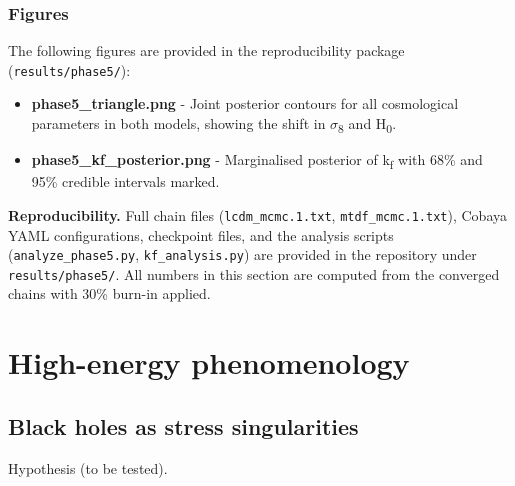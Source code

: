 \documentclass[11pt,a4paper]{article}
\begin{document}
\subsubsection{Figures}
The following figures are provided in the reproducibility package (\texttt{results/\allowbreak{}phase5/\allowbreak{}}):

\begin{itemize}
  \item \textbf{phase5\_\allowbreak{}triangle.png}  -  Joint posterior contours for all cosmological parameters in both models, showing the shift in $\sigma$\textsubscript{8} and H\textsubscript{0}.
  \item \textbf{phase5\_\allowbreak{}kf\_\allowbreak{}posterior.png}  -  Marginalised posterior of k\textsubscript{f} with 68\% and 95\% credible intervals marked.
\end{itemize}

\begin{mdframed}[linecolor=accent,linewidth=0.5pt,backgroundcolor=callout-bg,leftline=true,rightline=true,topline=true,bottomline=true,innerleftmargin=8pt,innerrightmargin=8pt,innertopmargin=6pt,innerbottommargin=6pt]
\textbf{Reproducibility.} Full chain files (\texttt{lcdm\_\allowbreak{}mcmc.1.txt}, \texttt{mtdf\_\allowbreak{}mcmc.1.txt}), Cobaya YAML configurations, checkpoint files, and the analysis scripts (\texttt{analyze\_\allowbreak{}phase5.py}, \texttt{kf\_\allowbreak{}analysis.py}) are provided in the repository under \texttt{results/\allowbreak{}phase5/\allowbreak{}}. All numbers in this section are computed from the converged chains with 30\% burn-in applied.
\end{mdframed}

\section{High-energy phenomenology}
\label{sec:high-energy}

\subsection{Black holes as stress singularities}
\begin{mdframed}[linecolor=accent,linewidth=0.5pt,backgroundcolor=callout-bg,leftline=true,rightline=true,topline=true,bottomline=true,innerleftmargin=8pt,innerrightmargin=8pt,innertopmargin=6pt,innerbottommargin=6pt]
Hypothesis (to be tested).
\end{mdframed}
\end{document}
